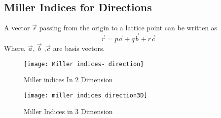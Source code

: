 \subsection{Miller Indices for Directions}
 A vector $\vec{r}$ passing from the origin to a lattice point can be written as
 \begin{equation}
 \vec{r}= p\vec{a}+q \vec{b}+r\vec{c}
 \end{equation}
  Where, $\vec{a}$, $\vec{b}$ ,$\vec{c}$ are basis vectors.\\
 \begin{minipage}{0.45\textwidth}
 \begin{figure}[H]
 	\centering
 	\texttt{[image: Miller indices- direction]}
 	\caption{Miller indices In 2 Dimension}
 	\label{}
 \end{figure}
 \end{minipage}
\begin{minipage}{0.45\textwidth}
	\begin{figure}[H]
		\centering
		\texttt{[image: miller indices direction3D]}
		\caption{Miller Indices in 3 Dimension}
		\label{}
	\end{figure}
\end{minipage}
 
 
